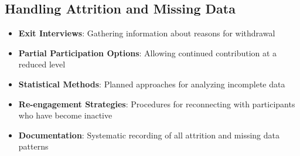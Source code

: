\subsection{Handling Attrition and Missing Data}
\begin{itemize}
    \item \textbf{Exit Interviews}: Gathering information about reasons for withdrawal
    
    \item \textbf{Partial Participation Options}: Allowing continued contribution at a reduced level
    
    \item \textbf{Statistical Methods}: Planned approaches for analyzing incomplete data
    
    \item \textbf{Re-engagement Strategies}: Procedures for reconnecting with participants who have become inactive
    
    \item \textbf{Documentation}: Systematic recording of all attrition and missing data patterns
\end{itemize}